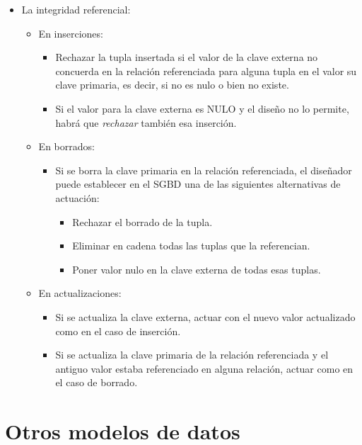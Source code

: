 \begin{itemize}
    \item La integridad referencial:
    \begin{itemize}
        \item En inserciones:
        \begin{itemize}
            \item Rechazar la tupla insertada si el valor de la clave externa no concuerda en la relación referenciada para alguna tupla en el valor su clave primaria, es decir, si no es nulo o bien no existe.
            \item Si el valor para la clave externa es NULO y el diseño no lo permite, habrá que \textit{rechazar} también esa inserción.
        \end{itemize}
        \item En borrados:
        \begin{itemize}
            \item Si se borra la clave primaria en la relación referenciada, el diseñador puede establecer en el SGBD una de las siguientes alternativas de actuación:
            \begin{itemize}
                \item Rechazar el borrado de la tupla.
                \item Eliminar en cadena todas las tuplas que la referencian.
                \item Poner valor nulo en la clave externa de todas esas tuplas.
            \end{itemize}
        \end{itemize}
        \item En actualizaciones:
        \begin{itemize}
            \item Si se actualiza la clave externa, actuar con el nuevo valor actualizado como en el caso de inserción.
            \item Si se actualiza la clave primaria de la relación referenciada y el antiguo valor estaba referenciado en alguna relación, actuar como en el caso de borrado.
        \end{itemize}
    \end{itemize}
\end{itemize}

\section{Otros modelos de datos}

